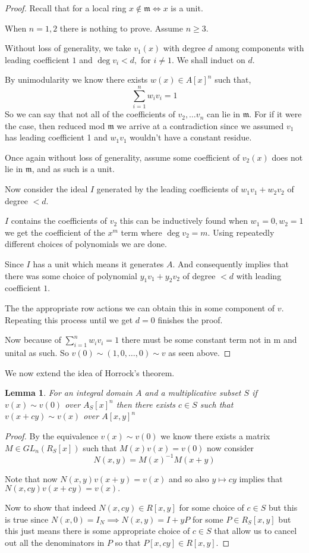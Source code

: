 \documentclass[12pt]{article}
\numberwithin{equation}{section}
\newtheorem{lemma}[theorem]{Lemma}
\begin{document}
	\begin{proof}
	Recall that for a local ring $x \not \in \mathfrak m \iff x  $ is a unit.
	
	When $n=1,2 $ there is nothing to prove. Assume $n \geq 3$.
	
	
	Without loss of generality, we take $v_1(x)$ with degree $d $ among components with leading coefficient $1$ and $\deg v_i < d, $ for $i \neq 1$. We shall induct on $d$.
	
	By unimodularity we know there exists $w(x)\in A[x]^n$ such that,
	\[ \sum_{i=1}^n w_i v_i = 1 \]
	So we can say that not all of the coefficients of $v_2, \dots v_n $ can lie in $\mathfrak m$. For if it were the case, then reduced mod $\mathfrak m$ we arrive at a contradiction since we assumed $v_1 $ has leading coefficient 1 and $w_1v_1$ wouldn't have a constant residue.
	
	Once again without loss of generality, assume some coefficient of $v_2(x)$ does not lie in $\mathfrak m$, and as such is a unit.
	
	Now consider the ideal $I$ generated by the leading coefficients of $w_1v_1+w_2v_2$ of degree $< d.$ 
	
	$I$ contains the coefficients of $v_2$ this can be inductively found when $w_1=0, w_2=1$ we get the coefficient of the $x^m$ term where $\deg v_2 = m$.
	Using repeatedly different choices of polynomials we are done.
	
	Since $I$ has a unit which means it generates $A$. And consequently implies that there was some choice of polynomial $y_1v_1+y_2v_2$ of degree $<d$ with leading coefficient $1$.
	
	The the appropriate row actions we can obtain this in some component of $v$. Repeating this process until we get $d=0$ finishes the proof.
	
	Now because of $\sum_{i=1}^n w_i v_i =1 $ there must be some constant term not in $\mathrm m $ and unital as such. So $v(0) \sim (1,0,\dots ,0 ) \sim v$ as seen above.
	\end{proof}
	
	We now extend the idea of Horrock's theorem.
	
	\begin{lemma}\label{horrocksbutforlocal}
		For an integral domain $A$ and a multiplicative subset $S$ if $v(x) \sim v(0)$ over $A_S[x]^n $ then there exists $c \in S$ such that $v(x+cy) \sim v(x) $ over $A[x,y]^n$
	\end{lemma}
	\begin{proof}
		By the equivalence $v(x) \sim v(0)$ we know there exists a matrix $M \in GL_n(R_S[x])$ such that $M(x)v(x)=v(0) $ now consider \[ N(x,y) = M(x)^{-1} M(x+y) \]
		
		Note that now $N(x,y)v(x+y)=v(x)$ and so also $y \mapsto cy$ implies that $N(x,cy)v(x+cy)=v(x).$
		
		Now to show that indeed $N(x,cy)\in R[x,y]$ for some choice of $c \in S$ but this is true since $N(x,0)=I_N \implies N(x,y)=I+yP $ for some $P \in R_S[x,y]$ but this just means there is some appropriate choice of $c \in S$ that allow us to cancel out all the denominators in $P$ so that $P[x,cy] \in R[x,y]$.
	\end{proof}
	
\end{document}
